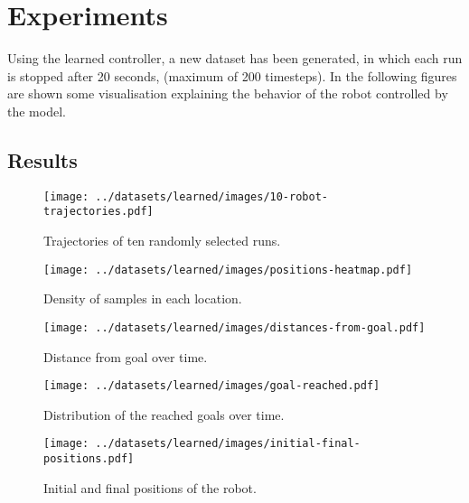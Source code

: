 \documentclass[conference]{IEEEtran}
\begin{document}
\section{Experiments}
Using the learned controller, a new dataset has been generated, in which each run is stopped after 20 seconds, (maximum 
of 200 timesteps). 
In the following figures are shown some visualisation explaining the behavior of the robot controlled by the model.

\subsection{Results}
\begin{figure}[htbp]
	\centerline{\texttt{[image: ../datasets/learned/images/10-robot-trajectories.pdf]}}
	\caption{Trajectories of ten randomly selected runs.}
	\label{fig:trajectories-learned}
\end{figure}

\begin{figure}[htbp]
	\centerline{\texttt{[image: ../datasets/learned/images/positions-heatmap.pdf]}}
	\caption{Density of samples in each location.}
	\label{fig:densisy-learned}
\end{figure}

\begin{figure}[htbp]
	\centerline{\texttt{[image: ../datasets/learned/images/distances-from-goal.pdf]}}
	\caption{Distance from goal over time.}
	\label{fig:distance-from-goal-learned}
\end{figure}

\begin{figure}[htbp]
	\centerline{\texttt{[image: ../datasets/learned/images/goal-reached.pdf]}}
	\caption{Distribution of the reached goals over time.}
	\label{fig:goal-reached-learned}
\end{figure}

\begin{figure}[htbp]
	\centerline{\texttt{[image: ../datasets/learned/images/initial-final-positions.pdf]}}
	\caption{Initial and final positions of the robot.}
	\label{fig:initial-final-positions-learned}
\end{figure}
\end{document}
